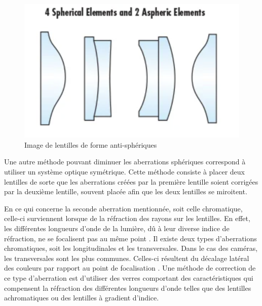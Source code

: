 \documentclass[11pt,letterpaper]{article}
\begin{document}
\begin{figure}[H]
  \centering
  \includegraphics[scale=0.4]{lentilles_aspherique.png}
  \caption{Image de lentilles de forme anti-sphériques \cite{leonov_aspheric_2018}}
  \label{lentilles_antisph}
\end{figure}

Une autre méthode pouvant diminuer les aberrations sphériques correspond à utiliser un système optique symétrique. Cette méthode consiste à placer deux lentilles de sorte que les aberrations créées par la première lentille soient corrigées par la deuxième lentille, souvent placée afin que les deux lentilles se miroitent.

En ce qui concerne la seconde aberration mentionnée, soit celle chromatique, celle-ci surviennent lorsque de la réfraction des rayons sur les lentilles. En effet, les différentes longueurs d'onde de la lumière, dû à leur diverse indice de réfraction, ne se focalisent pas au même point \cite{hollows_aberrations_2023}. Il existe deux types d'aberrations chromatiques, soit les longitudinales et les transversales. Dans le cas des caméras, les transversales sont les plus communes. Celles-ci résultent du décalage latéral des couleurs par rapport au point de focalisation \cite{rousseau_aberrations_2024}. Une méthode de correction de ce type d'aberration est d'utiliser des verres comportant des caractéristiques qui compensent la réfraction des différentes longueurs d'onde telles que des lentilles achromatiques ou des lentilles à gradient d'indice.
\end{document}
